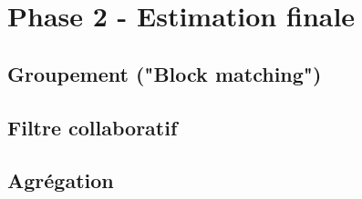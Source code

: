 \section{Phase 2 - Estimation finale}
\subsection{Groupement ("Block matching")}
\subsection{Filtre collaboratif}
\subsection{Agrégation}